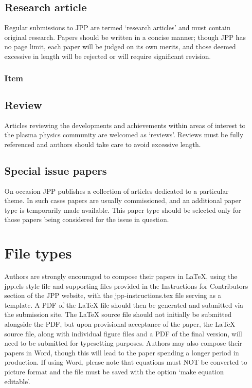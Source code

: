 \documentclass[12pt]{RBM_P}
\begin{document}
\subsection{Research article}
Regular submissions to JPP are termed `research articles' and must contain original research. Papers should be written in a concise manner; though JPP has no page limit, each paper will be judged on its own merits, and those deemed excessive in length will be rejected or will require significant revision.
\subsubsection{Item}

\subsection{Review}
Articles reviewing the developments and achievements within areas of interest to the plasma physics community are welcomed as `reviews'. Reviews must be fully referenced and authors should take care to avoid excessive length.

\subsection{Special issue papers}
On occasion JPP publishes a collection of articles dedicated to a particular theme. In such cases papers are usually commissioned, and an additional paper type is temporarily made available. This paper type should be selected only for those papers being considered for the issue in question. 

\section{File types}\label{sec:filetypes}
Authors are strongly encouraged to compose their papers in {\LaTeX}, using the jpp.cls style file and supporting files provided in the Instructions for Contributors section of the JPP website, with the jpp-instructions.tex file serving as a template. A PDF of the {\LaTeX} file should then be generated and submitted via the submission site. The {\LaTeX} source file should not initially be submitted alongside the PDF, but upon provisional acceptance of the paper, the {\LaTeX} source file, along with individual figure files and a PDF of the final version, will need to be submitted for typesetting purposes. 
Authors may also compose their papers in Word, though this will lead to the paper spending a longer period in production. If using Word, please note that equations must NOT be converted to picture format and the file must be saved with the option `make equation editable'. 
\end{document}
